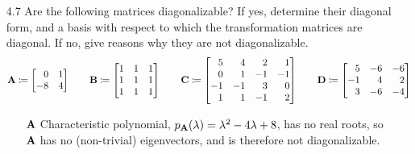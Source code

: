\documentclass[11pt]{article}
\begin{document}
\begin{enumerate}
    \item[4.7] Are the following matrices diagonalizable?  If yes, determine their diagonal
          form, and a basis with respect to which the transformation matrices are diagonal.  If no,
          give reasons why they are not diagonalizable.
          \[
              \mat{A} \coloneq
              \begin{bmatrix*}[r]
                  0 & 1 \\
                  -8 & 4 \\
              \end{bmatrix*}
              \qquad
              \mat{B} \coloneq
              \begin{bmatrix}
                  1 & 1 & 1 \\
                  1 & 1 & 1 \\
                  1 & 1 & 1 \\
              \end{bmatrix}
              \qquad
              \mat{C} \coloneq
              \begin{bmatrix*}[r]
                  5 & 4 & 2 & 1 \\
                  0 & 1 & -1 & -1 \\
                  -1 & -1 & 3 & 0 \\
                  1 & 1 & -1 & 2 \\
              \end{bmatrix*}
              \qquad
              \mat{D} \coloneq
              \begin{bmatrix*}[r]
                  5  & -6 & -6 \\
                  -1 & 4  & 2  \\
                  3  & -6 & -4 \\
              \end{bmatrix*}
          \]

          \begin{enumerate}[align=left]
              \item[$\mathbf{A}$] Characteristic polynomial, $p_{\mathbf{A}}(\lambda) = \lambda^2 - 4
                        \lambda + 8$, has no real roots, so $\mathbf{A}$ has no (non-trivial) eigenvectors, and is
                    therefore not diagonalizable.


\end{enumerate}
\end{enumerate}
\end{document}
